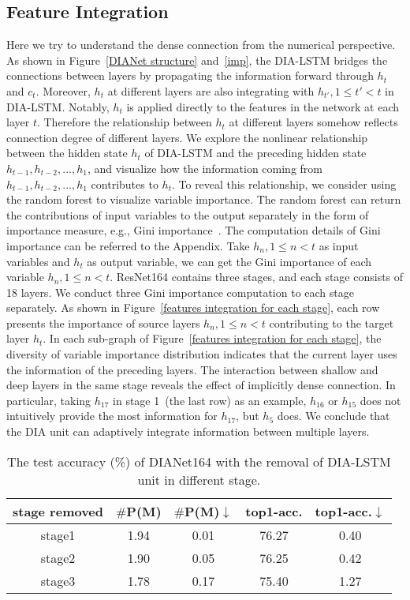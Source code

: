 \documentclass[letterpaper]{article} \usepackage{aaai20}  \usepackage{times}  \usepackage{helvet} \usepackage{courier}  \usepackage[hyphens]{url}  \usepackage{graphicx} \urlstyle{rm} \def\UrlFont{\rm}  \usepackage{graphicx}  \frenchspacing  \setlength{\pdfpagewidth}{8.5in}  \setlength{\pdfpageheight}{11in}  \usepackage{color}
\begin{document}
	\subsection{Feature Integration}
	Here we try to understand the dense connection from the numerical perspective. As shown in Figure~\ref{DIANet structure} and~\ref{imp}, the DIA-LSTM bridges the connections between layers by propagating the information forward through $h_t$ and $c_t$. Moreover, $h_t$ at different layers are also integrating with $h_{t'},1\leq t'<t$ in DIA-LSTM. Notably, $h_t$ is applied directly to the features in the network at each layer $t$. Therefore the relationship between $h_t$ at different layers somehow reflects connection degree of different layers. We explore the nonlinear relationship between the hidden state $h_t$ of DIA-LSTM and the preceding hidden state $h_{t-1},h_{t-2},...,h_1$, and visualize how the information coming from $h_{t-1},h_{t-2},...,h_1$ contributes to $h_t$. To reveal this relationship, we consider using the random forest to visualize variable importance. The random forest can return the contributions of input variables to the output separately in the form of importance measure, e.g., Gini importance~\cite{Gregorutti2017Correlation}. The computation details of Gini importance can be referred to the Appendix. Take $h_n,1\leq n < t$ as input variables and $h_t$ as output variable, we can get the Gini importance of each variable $h_n,1\leq n < t$. ResNet164 contains three stages, and each stage consists of 18 layers. We conduct three Gini importance computation to each stage separately. As shown in Figure~\ref{features integration for each stage}, each row presents the importance of source layers $h_n,1\leq n < t$ contributing to the target layer $h_t$. In each sub-graph of Figure~\ref{features integration for each stage}, the diversity of variable importance distribution indicates that the current layer uses the information of the preceding layers. The interaction between shallow and deep layers in the same stage reveals the effect of implicitly dense connection. In particular, taking $h_{17}$ in stage 1~(the last row) as an example, $h_{16}$ or $h_{15}$ does not intuitively provide the most information for $h_{17}$, but $h_5$ does. We conclude that the DIA unit can adaptively integrate information between multiple layers.
	\begin{table}[h]
			\small
			\centering
			\begin{tabular}{|c|c|c|c|c|}
				\toprule
				stage removed& $\#$P(M) & $\#$P(M)$\downarrow$ & top1-acc. & top1-acc.$\downarrow$ \\
				\midrule
				stage1 & 1.94  & 0.01  & 76.27 & 0.40 \\
				stage2 & 1.90   & 0.05  & 76.25 & 0.42 \\
				stage3 & 1.78  & 0.17  & 75.40  & 1.27 \\
				\bottomrule
			\end{tabular}\caption{The test accuracy (\%) of DIANet164 with the removal of DIA-LSTM unit in different stage.}
    \label{tab:remove stage}
\end{table}
\end{document}
